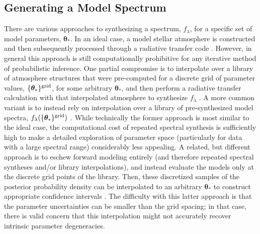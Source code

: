 \documentclass[iop,floatfix]{emulateapj}
\newcommand{\vt}{ {\bm \theta}}
\begin{document}
\subsection{Generating a Model Spectrum \label{subsec:synthetic}}

There are various approaches to synthesizing a spectrum, $f_{\lambda}$, for a specific set of model
parameters, $\vt_{\ast}$.  In an ideal case, a model stellar atmosphere is constructed and then 
subsequently processed through a radiative transfer code \citep[e.g.,][]{kurucz93,hauschildt99}.  
However, in general this approach is still computationally prohibitive for any iterative method of 
probabilistic inference.  One partial compromise is to interpolate over a library of atmosphere 
structures that were pre-computed for a discrete grid of parameter values, $\{\vt_{\ast}\}^{\rm 
grid}$, for some arbitrary $\vt_{\ast}$, and then perform a radiative transfer calculation with 
that interpolated atmosphere to synthesize $f_{\lambda}$ \citep[e.g., as for SME;][]{valenti96}.  A more 
common variant is to instead rely on interpolation over a library of pre-synthesized model spectra, 
$f_{\lambda}(\{\vt_{\ast}\}^{\rm grid})$ \citep[e.g.,][]{castelli04,allard12,husser13}.  While 
technically the former approach is most similar to the ideal case, the computational cost of 
repeated spectral synthesis is sufficiently high to make a detailed exploration of parameter space 
(particularly for data with a large spectral range) considerably less appealing.  A related, but 
different approach is to eschew forward modeling entirely (and therefore repeated spectral 
syntheses and/or library interpolations), and instead evaluate the models only at the discrete grid 
points of the library.  Then, these discretized samples of the posterior probability density can be 
interpolated to an arbitrary $\vt_{\ast}$ to construct appropriate confidence intervals 
\citep[e.g., the method of SPC;][]{buchhave12}.  The difficulty with this latter approach is that the 
parameter uncertainties can be smaller than the grid spacing; in that case, there is valid concern 
that this interpolation might not accurately recover intrinsic parameter degeneracies.
\end{document}
